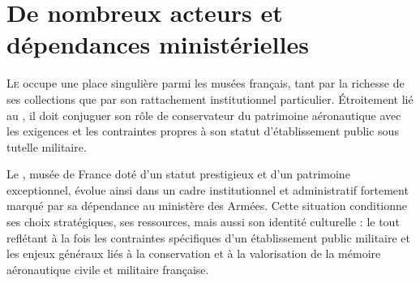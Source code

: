 \chapter[Acteurs et dépendances]{\label{I-B}De nombreux acteurs et dépendances ministérielles }


\lettrine{L}e \maelong occupe une place singulière parmi les musées français, tant par la richesse de ses collections que par son rattachement institutionnel particulier. Étroitement lié au \minarm, il doit conjuguer son rôle de conservateur du patrimoine aéronautique avec les exigences et les contraintes propres à son statut d’établissement public sous tutelle militaire.





\bigskip
\bigskip
\bigskip

Le \maelong, musée de France doté d’un statut prestigieux et d’un patrimoine exceptionnel, évolue ainsi dans un cadre institutionnel et administratif fortement marqué par sa dépendance au ministère des Armées. Cette situation conditionne ses choix stratégiques, ses ressources, mais aussi son identité culturelle : le tout reflétant à la fois les contraintes spécifiques d’un établissement public militaire et les enjeux généraux liés à la conservation et à la valorisation de la mémoire aéronautique civile et militaire française.

\bigskip
\bigskip
\bigskip